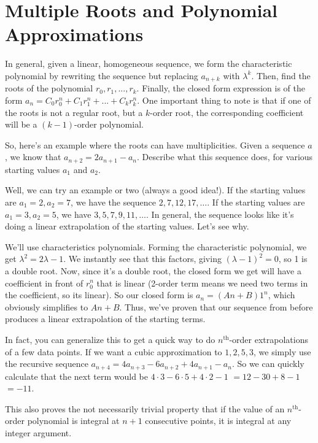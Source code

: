 \documentclass[12pt,letterpaper]{article}
\renewcommand{\th}{\ensuremath{^{\text{th}}}}
\begin{document}
\section{Multiple Roots and Polynomial Approximations}
In general, given a linear, homogeneous sequence, we form the
characteristic polynomial by rewriting the sequence but replacing
$a_{n+k}$ with $\lambda^k$. Then, find the roots of the polynomial
$r_0, r_1, ..., r_k$. Finally, the closed form expression is of the
form $a_n = C_0 r_0^n + C_1 r_1^n + ... + C_k r_k^n$. One important
thing to note is that if one of the roots is not a regular root, but a
$k$-order root, the corresponding coefficient will be a $(k-1)$-order
polynomial.

So, here's an example where the roots can have multiplicities. Given a
sequence $a$, we know that $a_{n+2} = 2a_{n+1} - a_n$. Describe what
this sequence does, for various starting values $a_1$ and $a_2$.

Well, we can try an example or two (always a good idea!). If the starting
values are $a_1 = 2, a_2 = 7$, we have the sequence $2, 7, 12, 17, \ldots$.
If the starting values are $a_1 = 3, a_2 = 5$, we have $3, 5, 7, 9, 11, \ldots$.
In general, the sequence looks like it's doing a linear extrapolation of
the starting values. Let's see why.

We'll use characteristics polynomials. Forming the characteristic polynomial,
we get $\lambda^2 = 2\lambda - 1$. We instantly see that this factors, giving
$(\lambda - 1)^2 = 0$, so 1 is a double root. Now, since it's a double root,
the closed form we get will have a coefficient in front of $r_0^n$ that is
linear (2-order term means we need two terms in the coefficient, so its linear).
So our closed form is $a_n = (An + B)1^n$, which obviously simplifies to $An+B$.
Thus, we've proven that our sequence from before produces a linear extrapolation
of the starting terms.

In fact, you can generalize this to get a quick way to do $n\th$-order extrapolations
of a few data points. If we want a cubic approximation to $1, 2, 5, 3$, we simply
use the recursive sequence $a_{n+4} = 4a_{n+3} - 6a_{n+2} + 4a_{n+1} - a_n$. So we
can quickly calculate that the next term would be $4 \cdot 3 - 6 \cdot 5 + 4 \cdot
2 - 1$ $= 12 - 30 + 8 - 1$ $=-11$.

This also proves the not necessarily trivial property that if the value of an
$n\th$-order polynomial is integral at $n+1$ consecutive points, it is integral
at any integer argument.
\end{document}
